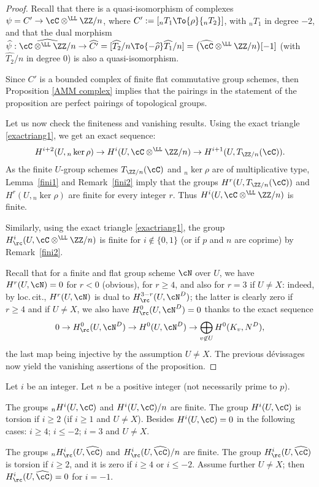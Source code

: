 \begin{proof}
Recall that there is a quasi-isomorphism of complexes $\psi = C' \to \cC \otimes^\LL \ZZ / n$, where $C':= [{_n T_1} \To{\rho} {_n T_2}]$, with ${_n T_1}$ in degree $-2$, and that the dual morphism $\widehat{\psi}: \widehat{\cC \otimes^\LL \ZZ / n} \to \widehat{C'} = [\widehat{T_2}/n \To{-\widehat{\rho}} \widehat{T_1}/n] = \bigl(\widehat{\cC} \otimes^\LL \ZZ / n \bigr)[-1]$ (with $\widehat{T_2}/n$ in degree $0$) is also a quasi-isomorphism.

Since $C'$ is a bounded complex of finite flat commutative group schemes, then Proposition \ref{AMM complex} implies that the pairings in the statement of the proposition are perfect pairings of topological groups.

Let us now check the finiteness and vanishing results.
Using the exact triangle \eqref{exactriang1}, we get an exact sequence:
\[
H^{i+2}(U,{_n \ker \rho}) \to H^i(U, \cC \otimes^\LL \ZZ/n) \to H^{i+1}(U, T_{\ZZ/n}(\cC)).
\]
As the finite $U$-group schemes $T_{\ZZ/n}(\cC)$ and
$_n \ker \rho$ are of multiplicative type, Lemma~\ref{fini1}
and Remark~\ref{fini2}
imply that the groups $H^r(U,T_{\ZZ/n}(\cC))$ and
$H^r(U,{}_n\!\ker \rho)$ are finite for every integer $r$. Thus
$H^i(U, \cC \otimes^\LL \ZZ/n)$ is finite.

Similarly, using the exact triangle \eqref{exactriang1}, the group $H^i_\rc(U, \cC \otimes^\LL \ZZ/n)$ is finite for
$i \not \in \{0, 1\}$ (or if $p$ and $n$ are coprime) by Remark~\ref{fini2}.

Recall that for a finite and flat group scheme $\cN$ over $U$,
we have $H^r(U,\cN)=0$ for $r <0$ (obvious), for $r \geq 4$,
and also for $r=3$ if $U \neq X$: indeed, by loc.\,cit., $H^r(U,\cN)$
is dual to $H^{3-r}_\rc(U,\cN^D)$; the latter is clearly zero if
$r \geq 4$ and
if $U \neq X$, we also have $H^0_\rc(U,\cN^D)=0$
thanks to the exact sequence
\[
0 \to H^0_\rc(U,\cN^D) \to H^0(U,\cN^D) \to
\bigoplus_{v \not \in U} H^0(K_v,N^D),
\]
the last map being injective by the assumption $U \neq X$.
The previous dévissages now yield the vanishing assertions of
the proposition.
\end{proof}

\pagebreak[2]
\begin{prop} \label{finivanish1}
Let $i$ be an integer. Let $n$ be a positive integer (not necessarily prime
to $p$).
\begin{enumeratea}
\item\label{finivanish1a}
The groups $_n H^i(U, \cC)$ and
$H^i(U, \cC)/n$ are finite. The group
$H^i(U, \cC)$ is torsion if $i \geq 2 $ (\resp if $i \geq 1$ and
$U \neq X$). Besides $H^i(U, \cC)=0$ in the following cases:
$i \geq 4$; $i \leq -2$; $i=3$ and $U \neq X$.

\item\label{finivanish1b}
The groups $_n H^i_\rc(U, \widehat \cC)$ and
$H^i_\rc(U, \widehat \cC)/n$ are finite. The group
$H^i_\rc(U, \widehat \cC)$ is torsion if $i \geq 2$, and it is
zero if $i \geq 4$ or $i \leq -2$. Assume further $U \neq X$; then
$H^i_\rc(U, \widehat \cC)=0$ for $i=-1$.
\end{enumeratea}
\end{prop}

